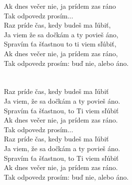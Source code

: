 \begin{multicols}{2}
Ak dnes večer nie, ja prídem zas ráno\\
Tak odpovedz prosím...\\
Raz príde čas, kedy budeš ma ľúbiť,\\
Ja viem že sa dočkám a ty povieš áno,\\
Spravím ťa šťastnou to ti viem sľúbiť,\\
Ak dnes večer nie, ja prídem zas ráno,\\
Tak odpovedz prosím: buď nie, alebo áno.\\
\\
\\
Raz príde čas, kedy budeš ma ľúbiť\\
Ja viem, že sa dočkám a ty povieš áno.\\
Spravím ťa šťastnou, to Ti viem sľúbiť\\
Ak dnes večer nie, ja prídem zas ráno.\\
Tak odpovedz prosím...\\
Raz príde čas, kedy budeš ma ľúbiť\\
Ja viem, že sa dočkám a ty povieš áno.\\
Spravím ťa šťastnou, to Ti viem sľúbiť\\
Ak dnes večer nie, ja prídem zas ráno.\\
Tak odpovedz prosím: buď nie, alebo áno.
\end{multicols}
